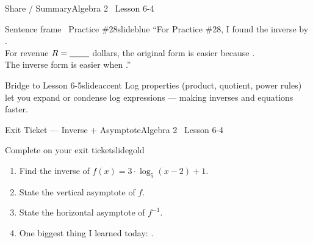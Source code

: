 \documentclass[aspectratio=169, 11pt]{beamer}
\begin{document}
\begin{frame}{Share / Summary}{Algebra 2 \textperiodcentered\ Lesson 6-4}
\vspace{0.2cm}
\begin{projcard}{Sentence frame \textperiodcentered\ Practice \#28}{slideblue}
\small ``For Practice \#28, I found the inverse by \underline{\hspace{2.2cm}}.\\
For revenue \(R = \underline{\hspace{0.8cm}}\) dollars, the original form is easier because \underline{\hspace{2cm}}.\\
The inverse form is easier when \underline{\hspace{2.8cm}}.''
\end{projcard}

\vspace{0.15cm}
\begin{projcard}{Bridge to Lesson 6-5}{slideaccent}
\small Log properties (product, quotient, power rules) let you expand or condense log expressions --- making inverses and equations faster.
\end{projcard}
\end{frame}

\begin{frame}{Exit Ticket --- Inverse + Asymptote}{Algebra 2 \textperiodcentered\ Lesson 6-4}
\vspace{0.2cm}
\begin{projcard}{Complete on your exit ticket}{slidegold}
\begin{enumerate}
  \setlength{\itemsep}{0.25cm}
  \item Find the inverse of \(f(x) = 3\cdot\log_5(x-2)+1\).
  \item State the vertical asymptote of \(f\).
  \item State the horizontal asymptote of \(f^{-1}\).
  \item One biggest thing I learned today: \underline{\hspace{4cm}}.
\end{enumerate}
\end{projcard}
\end{frame}
\end{document}
